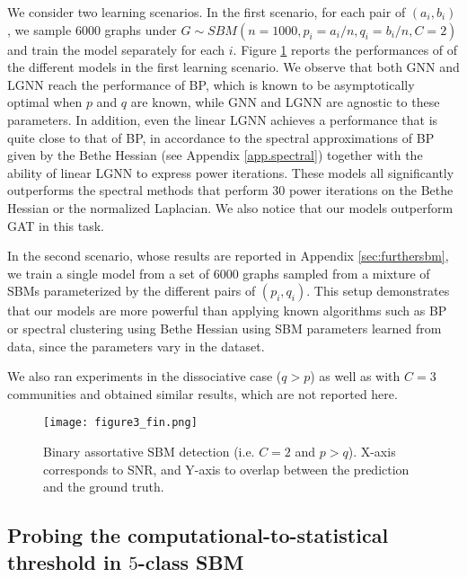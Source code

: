 \documentclass{article} \usepackage{iclr2019_conference,times}
\begin{document}
We consider two learning scenarios. In the first scenario, for each pair of $(a_i, b_i)$, we sample $6000$ graphs under $G \sim SBM(n=1000, p_i = a_i / n, q_i = b_i / n, C=2)$ and train the model separately for each $i$.
Figure \ref{fig:BH1} reports the performances of
of the different models in the first learning scenario.
We observe that both GNN and LGNN reach the performance of BP, which is known to be asymptotically optimal \cite{coja2016information} when $p$ and $q$ are known, while GNN and LGNN are agnostic to these parameters.
In addition, even the linear LGNN achieves a performance that is quite close to that of BP, in accordance to the spectral approximations of BP given by the Bethe Hessian (see Appendix \ref{app.spectral}) together with the ability of linear LGNN to express power iterations. These models all significantly outperforms the spectral methods that perform 30 power iterations on the Bethe Hessian or the normalized Laplacian.
We also notice that our models outperform GAT in this task.


In the second scenario, whose results are reported in Appendix \ref{sec:furthersbm}, we train a single model from a set of $6000$ graphs sampled from a mixture of SBMs parameterized by the different pairs of $(p_i, q_i)$. This setup demonstrates that our models are more powerful than applying known algorithms such as BP or spectral clustering using Bethe Hessian using SBM parameters learned from data, since the parameters vary in the dataset. 

We also ran experiments in the dissociative case ($q > p$) as well as with $C=3$ communities and obtained similar results, which are not reported here. 
















\begin{figure}\centering
\texttt{[image: figure3\_fin.png]}\caption{Binary assortative SBM detection (i.e. $C=2$ and $p > q$). X-axis corresponds to SNR, and Y-axis to overlap between the prediction and the ground truth.}
\label{fig:BH1}
\end{figure}







\subsection{Probing the computational-to-statistical threshold in $5$-class SBM}
\label{SBMsec2}
\end{document}
